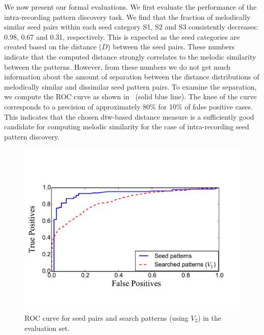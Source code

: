 We now present our formal evaluations. We first evaluate the performance of the intra-recording pattern discovery task. We find that the fraction of melodically similar seed pairs within each seed category S1, S2 and S3 consistently decreases: 0.98, 0.67 and 0.31, respectively. This is expected as the seed categories are created based on the distance ($D$) between the seed pairs. These numbers indicate that the computed distance strongly correlates to the melodic similarity between the patterns. However, from these numbers we do not get much information about the amount of separation between the distance distributions of melodically similar and dissimilar seed pattern pairs. To examine the separation, we compute the ROC curve as shown in~ (solid blue line). The knee of the curve corresponds to a precision of approximately 80\% for 10\% of false positive cases. This indicates that the chosen \gls{dtw}-based distance measure is a sufficiently good candidate for computing melodic similarity for the case of intra-recording seed pattern discovery. 


\begin{figure}
	\begin{center}
		\includegraphics[width=\figSizeEightyFive]{ch06_patterns/figures/discovery/seedROC.pdf}
	\end{center}
	\caption{ROC curve for seed pairs and search patterns (using $V_2$) in the evaluation set.}%
	\label{fig:combinedROCPatternDiscovery}
\end{figure}

